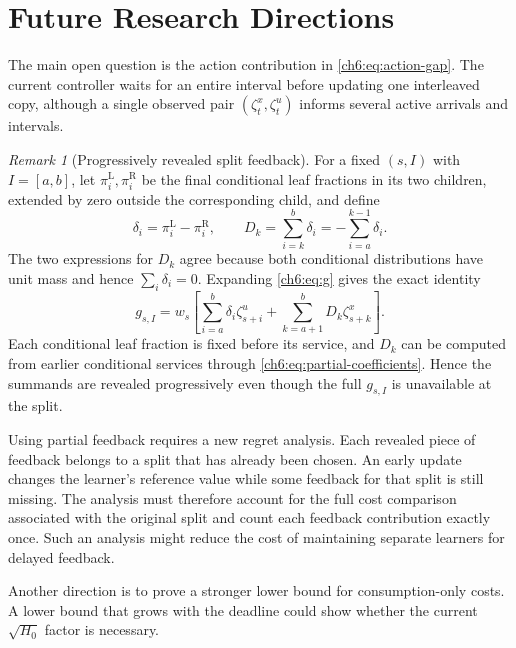 \documentclass[11pt]{article}
\theoremstyle{plain}
\theoremstyle{remark}
\newtheorem{Thm:Remark}[Thm:Theorem]{Remark}
\numberwithin{equation}{section}
\begin{document}
\section{Future Research Directions}
\label{ch6:sec:next}
The main open question is the action contribution in
\eqref{ch6:eq:action-gap}. The current controller waits for an entire
interval before updating one interleaved copy, although a single observed
pair $(\zeta_t^x,\zeta_t^u)$ informs several active arrivals and intervals.

\begin{Thm:Remark}[Progressively revealed split feedback]
For a fixed $(s,I)$ with $I=[a,b]$, let $\pi^{\mathrm{L}}_i,\pi^{\mathrm{R}}_i$ be the final
conditional leaf fractions in its two children, extended by zero outside
the corresponding child, and define
\begin{equation}\label{ch6:eq:partial-coefficients}
 \delta_i=\pi^{\mathrm{L}}_i-\pi^{\mathrm{R}}_i,\qquad
 D_k=\sum_{i=k}^b\delta_i=-\sum_{i=a}^{k-1}\delta_i.
\end{equation}
The two expressions for $D_k$ agree because both conditional distributions
have unit mass and hence $\sum_i\delta_i=0$.
Expanding \eqref{ch6:eq:g} gives the exact identity
\begin{equation}\label{ch6:eq:partial}
 \boxed{g_{s,I}=w_s\left[
 \sum_{i=a}^b\delta_i\zeta_{s+i}^u
 +\sum_{k=a+1}^bD_k\zeta_{s+k}^x\right].}
\end{equation}
Each conditional leaf fraction is fixed before its service, and $D_k$ can
be computed from earlier conditional services through
\eqref{ch6:eq:partial-coefficients}. Hence the summands are revealed
progressively even though the full $g_{s,I}$ is unavailable at the split.
\end{Thm:Remark}

Using partial feedback requires a new regret analysis. Each revealed
piece of feedback belongs to a split that has already been chosen. An
early update changes the learner's reference value while some feedback
for that split is still missing. The analysis must therefore account for
the full cost comparison associated with the original split and count
each feedback contribution exactly once. Such an analysis might reduce
the cost of maintaining separate learners for delayed feedback.

Another direction is to prove a stronger lower bound for consumption-only
costs. A lower bound that grows with the deadline could show whether the
current $\sqrt{H_0}$ factor is necessary.
\end{document}
